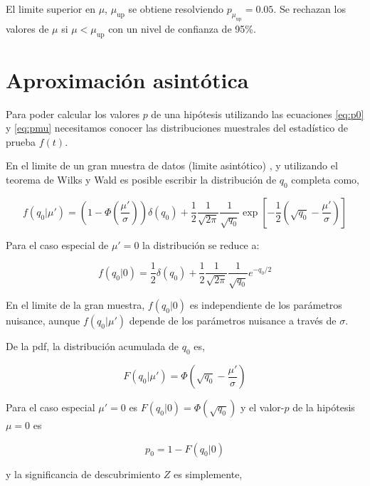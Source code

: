 El limite superior {\cls} en $\mu$, $\mu_\text{up}$ se obtiene resolviendo $p_{\mu_\text{up}} = 0.05$.
Se rechazan los valores de $\mu$ si $\mu  < \mu_\text{up}$ con un nivel de confianza de 95\%.


\section{Aproximación asintótica}

Para poder calcular los valores $p$ de una hipótesis utilizando las ecuaciones
\eqref{eq:p0} y \eqref{eq:pmu} necesitamos conocer las distribuciones muestrales del
estadístico de prueba $f(t)$.

En el limite de un gran muestra de datos (limite asintótico) \cite{AsymAprox}, y utilizando el teorema
de Wilks\cite{WilksTheo} y Wald\cite{WaldTheo} es posible escribir la distribución
de $q_0$ completa como,

\begin{equation}
  f(q_0|\mu') = \left( 1 - \Phi\left(\frac{\mu'}{\sigma}\right)\right) \delta(q_0) +
  \frac{1}{2}\frac{1}{\sqrt{2\pi}}\frac{1}{\sqrt{q_0}} \exp \left[ -\frac{1}{2} \left( \sqrt{q_0} - \frac{\mu'}{\sigma} \right)\right]
\end{equation}

Para el caso especial de $\mu' = 0$ la distribución se reduce a:

\begin{equation}
  f(q_0|0) = \frac{1}{2} \delta(q_0) + \frac{1}{2}\frac{1}{\sqrt{2\pi}}\frac{1}{\sqrt{q_0}} e^{-q_0/2}
\end{equation}

En el limite de la gran muestra, $f(q_0|0)$ es independiente de los parámetros nuisance,
aunque $f(q_0|\mu')$ depende de los parámetros nuisance a través de $\sigma$.

De la pdf, la distribución acumulada de $q_0$ es,

\begin{equation}
  F(q_0|\mu') = \Phi \left( \sqrt{q_0} - \frac{\mu'}{\sigma} \right)
\end{equation}

Para el caso especial $\mu' = 0$ es $F(q_0|0) = \Phi(\sqrt{q_0})$ y el valor-$p$
de la hipótesis $\mu=0$ es

\begin{equation}
  p_0 = 1 - F(q_0|0)
\end{equation}

y la significancia de descubrimiento $Z$ es simplemente,

